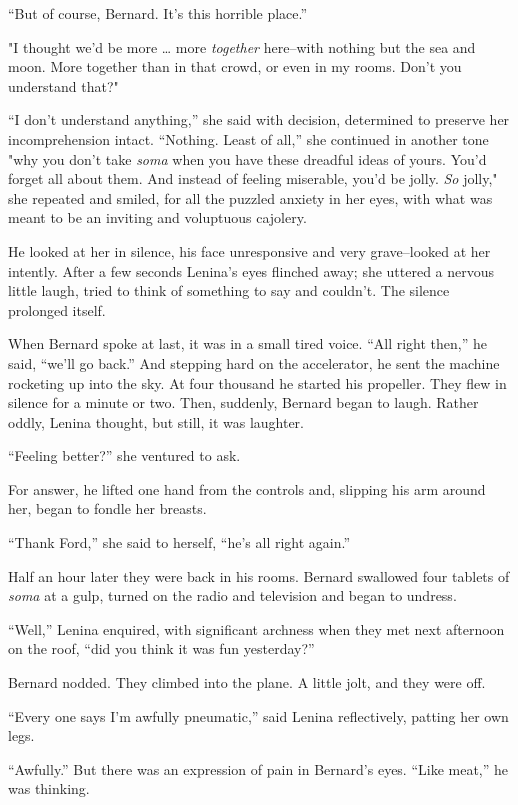 \documentclass[12pt]{report}
\begin{document}
``But of course, Bernard. It's this horrible place.''

"I thought we'd be more \ldots{} more \emph{together} here--with nothing
but the sea and moon. More together than in that crowd, or even in my
rooms. Don't you understand that?"

``I don't understand anything,'' she said with decision, determined to
preserve her incomprehension intact. ``Nothing. Least of all,'' she
continued in another tone "why you don't take \emph{soma} when you have
these dreadful ideas of yours. You'd forget all about them. And instead
of feeling miserable, you'd be jolly. \emph{So} jolly," she repeated and
smiled, for all the puzzled anxiety in her eyes, with what was meant to
be an inviting and voluptuous cajolery.

He looked at her in silence, his face unresponsive and very
grave--looked at her intently. After a few seconds Lenina's eyes
flinched away; she uttered a nervous little laugh, tried to think of
something to say and couldn't. The silence prolonged itself.

When Bernard spoke at last, it was in a small tired voice. ``All right
then,'' he said, ``we'll go back.'' And stepping hard on the
accelerator, he sent the machine rocketing up into the sky. At four
thousand he started his propeller. They flew in silence for a minute or
two. Then, suddenly, Bernard began to laugh. Rather oddly, Lenina
thought, but still, it was laughter.

``Feeling better?'' she ventured to ask.

For answer, he lifted one hand from the controls and, slipping his arm
around her, began to fondle her breasts.

``Thank Ford,'' she said to herself, ``he's all right again.''

Half an hour later they were back in his rooms. Bernard swallowed four
tablets of \emph{soma} at a gulp, turned on the radio and television and
began to undress.

``Well,'' Lenina enquired, with significant archness when they met next
afternoon on the roof, ``did you think it was fun yesterday?''

Bernard nodded. They climbed into the plane. A little jolt, and they
were off.

``Every one says I'm awfully pneumatic,'' said Lenina reflectively,
patting her own legs.

``Awfully.'' But there was an expression of pain in Bernard's eyes.
``Like meat,'' he was thinking.
\end{document}

